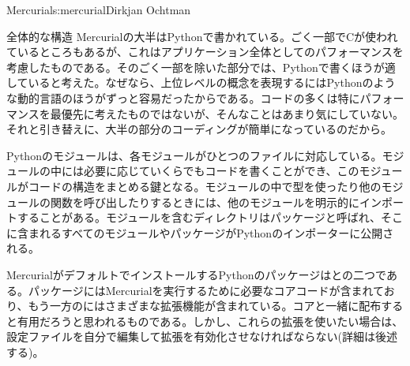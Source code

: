 \begin{aosachapter}{Mercurial}{s:mercurial}{Dirkjan Ochtman}
\begin{aosasect1}{全体的な構造}
Mercurialの大半はPythonで書かれている。ごく一部でCが使われているところもあるが、これはアプリケーション全体としてのパフォーマンスを考慮したものである。そのごく一部を除いた部分では、Pythonで書くほうが適していると考えた。なぜなら、上位レベルの概念を表現するにはPythonのような動的言語のほうがずっと容易だったからである。コードの多くは特にパフォーマンスを最優先に考えたものではないが、そんなことはあまり気にしていない。それと引き替えに、大半の部分のコーディングが簡単になっているのだから。

Pythonのモジュールは、各モジュールがひとつのファイルに対応している。モジュールの中には必要に応じていくらでもコードを書くことができ、このモジュールがコードの構造をまとめる鍵となる。モジュールの中で型を使ったり他のモジュールの関数を呼び出したりするときには、他のモジュールを明示的にインポートすることがある。モジュールを含むディレクトリはパッケージと呼ばれ、そこに含まれるすべてのモジュールやパッケージがPythonのインポーターに公開される。

MercurialがデフォルトでインストールするPythonのパッケージはとの二つである。パッケージにはMercurialを実行するために必要なコアコードが含まれており、もう一方のにはさまざまな拡張機能が含まれている。コアと一緒に配布すると有用だろうと思われるものである。しかし、これらの拡張を使いたい場合は、設定ファイルを自分で編集して拡張を有効化させなければならない(詳細は後述する)。


\end{aosasect1}
\end{aosachapter}
